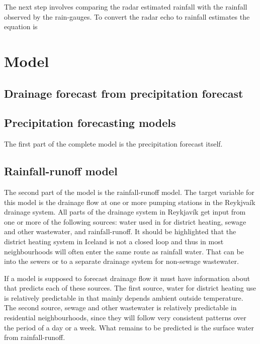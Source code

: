 The next step involves comparing the radar estimated rainfall with the rainfall observed by the rain-gauges. To convert the radar echo to rainfall estimates the equation is 

\section{Model}


\subsection{Drainage forecast from precipitation forecast}



\subsection{Precipitation forecasting models}
The first part of the complete model is the precipitation forecast itself. 



\subsection{Rainfall-runoff model}
The second part of the model is the rainfall-runoff model. The target variable for this model is the drainage flow at one or more pumping stations in the Reykjvaík drainage system. All parts of the drainage system in Reykjavík get input from one or more of the following sources: water used in for district heating, sewage and other wastewater, and rainfall-runoff. It should be highlighted that the district heating system in Iceland is not a closed loop and thus in most neighbourhoods will often enter the same route as rainfall water. That can be into the sewers or to a separate drainage system for non-sewage wastewater. 

If a model is supposed to forecast drainage flow it must have information about that predicts each of these sources. The first source, water for district heating use is relatively predictable in that mainly depends ambient outside temperature. The second source, sewage and other wastewater is relatively predictable in residential neighbourhoods, since they will follow very consistent patterns over the period of a day or a week. What remains to be predicted is the surface water from rainfall-runoff. 

